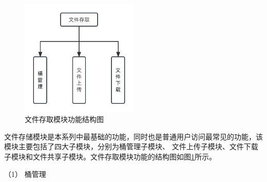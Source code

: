 \begin{figure}[h]
    \centering
    \includegraphics[width=0.5\textwidth]{my_figures/chapter4/文件存取模块功能结构图.png}
    \caption{文件存取模块功能结构图}
    \label{fig:文件存取模块功能结构图}
\end{figure}

文件存储模块是本系列中最基础的功能，同时也是普通用户访问最常见的功能，该模块主要包括了四大子模块，分别为桶管理子模块、
文件上传子模块、文件下载子模块和文件共享子模块。文件存取模块功能的结构图如图\ref{fig:文件存取模块功能结构图}所示。



（1） 桶管理



